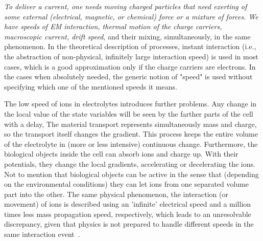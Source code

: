 {

\textit{To deliver a
current, one needs moving charged particles that need exerting of some
external (electrical, magnetic, or chemical) force or a mixture of forces.
We have speeds of 
\gls{EM} interaction, thermal motion of the charge
carriers, macroscopic current, drift speed}, and their mixing, simultaneously,
in the same phenomenon. In the theoretical description of
processes, instant interaction (i.e., the abstraction of non-physical,
infinitely large interaction speed) is used in most cases, which is a
good approximation only if the charge carriers are electrons. In the
cases when absolutely needed, the generic notion of "speed" is
used without specifying which one of the mentioned speeds it means.

The low speed of ions in electrolytes introduces further problems.
Any change in the local value of the state variables will be seen
by the farther parts of the cell with a delay,
The material transport represents simultaneously mass and charge,
so the transport itself changes the gradient. This process keeps the entire volume of the electrolyte in (more or less intensive) continuous change. Furthermore, the biological objects inside the cell
can absorb ions and charge up. With their potentials, they change the local gradients, accelerating or decelerating the ions. 
Not to mention that biological objects can be active in the sense that 
(depending on the environmental conditions) they can let ions from one separated volume part into the other. 
The same physical phenomenon,
the interaction (or movement) of ions is described using an 'infinite' electrical speed and 
a million times less mass propagation speed, respectively, which leads
to an unresolvable discrepancy, given that physics is not prepared to handle
different speeds in the same interaction event~\cite{VeghNon-ordinaryLaws:2025}.
}


